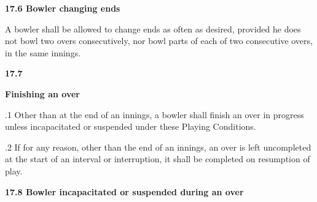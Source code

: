 \documentclass[12pt]{article}
\begin{document}
\vspace{\baselineskip}
{\fontsize{11pt}{13.2pt}\selectfont \textbf{17.6 \tabto{0.47in} Bowler changing ends}\par}\par


\vspace{\baselineskip}
\begin{adjustwidth}{0.0in}{0.19in}
{\fontsize{9pt}{10.8pt}\selectfont A bowler shall be allowed to change ends as often as desired, provided he does not bowl two overs consecutively, nor bowl parts of each of two consecutive overs, in the same innings.\par}\par

\end{adjustwidth}


\vspace{\baselineskip}
{\fontsize{11pt}{13.2pt}\selectfont \textbf{17.7 \tabto{0.47in} }{\fontsize{10pt}{12.0pt}\selectfont \textbf{Finishing an over}\par}\par}\par


\vspace{\baselineskip}
\begin{adjustwidth}{0.5in}{0.5in}
{\fontsize{9pt}{10.8pt}.1 \tabto{0.49in} Other than at the end of an innings, a bowler shall finish an over in progress unless incapacitated or suspended under these Playing Conditions.\par}\par

\end{adjustwidth}


\vspace{\baselineskip}
\begin{adjustwidth}{0.5in}{0.18in}
{\fontsize{9pt}{10.8pt}.2 \tabto{0.49in} If for any reason, other than the end of an innings, an over is left uncompleted at the start of an interval or interruption, it shall be completed on resumption of play.\par}\par

\end{adjustwidth}


\vspace{\baselineskip}
{\fontsize{11pt}{13.2pt}\selectfont \textbf{17.8 \tabto{0.47in} Bowler incapacitated or suspended during an over}\par}\par
\end{document}
